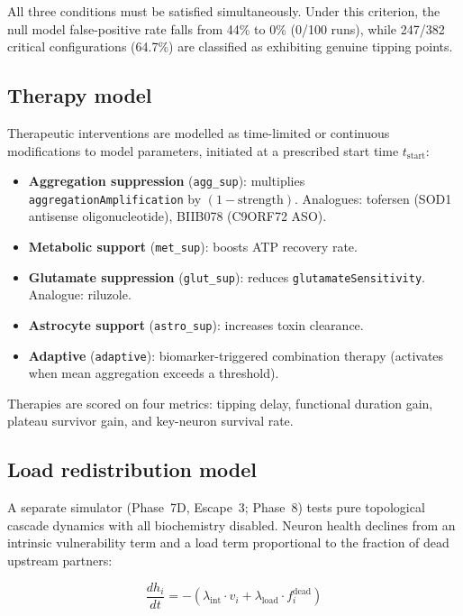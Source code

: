 \documentclass[12pt,a4paper]{article}
\begin{document}
All three conditions must be satisfied simultaneously. Under this criterion, the null model
false-positive rate falls from 44\% to 0\% (0/100 runs), while 247/382 critical configurations
(64.7\%) are classified as exhibiting genuine tipping points.

\subsection{Therapy model}

Therapeutic interventions are modelled as time-limited or continuous modifications to model
parameters, initiated at a prescribed start time $t_{\text{start}}$:

\begin{itemize}
\item \textbf{Aggregation suppression} (\texttt{agg\_sup}): multiplies
\texttt{aggregationAmplification} by $(1 - \text{strength})$. Analogues: tofersen (SOD1
antisense oligonucleotide), BIIB078 (C9ORF72 ASO).
\item \textbf{Metabolic support} (\texttt{met\_sup}): boosts ATP recovery rate.
\item \textbf{Glutamate suppression} (\texttt{glut\_sup}): reduces
\texttt{glutamateSensitivity}. Analogue: riluzole.
\item \textbf{Astrocyte support} (\texttt{astro\_sup}): increases toxin clearance.
\item \textbf{Adaptive} (\texttt{adaptive}): biomarker-triggered combination therapy
(activates when mean aggregation exceeds a threshold).
\end{itemize}

Therapies are scored on four metrics: tipping delay, functional duration gain, plateau survivor
gain, and key-neuron survival rate.

\subsection{Load redistribution model}

A separate simulator (Phase~7D, Escape~3; Phase~8) tests pure topological cascade dynamics with
all biochemistry disabled. Neuron health declines from an intrinsic vulnerability term and a
load term proportional to the fraction of dead upstream partners:

\begin{equation}
\frac{dh_i}{dt} = -\!\left(\lambda_{\text{int}} \cdot v_i
  + \lambda_{\text{load}} \cdot f_i^{\text{dead}}\right)
\label{eq:load}
\end{equation}
\end{document}
